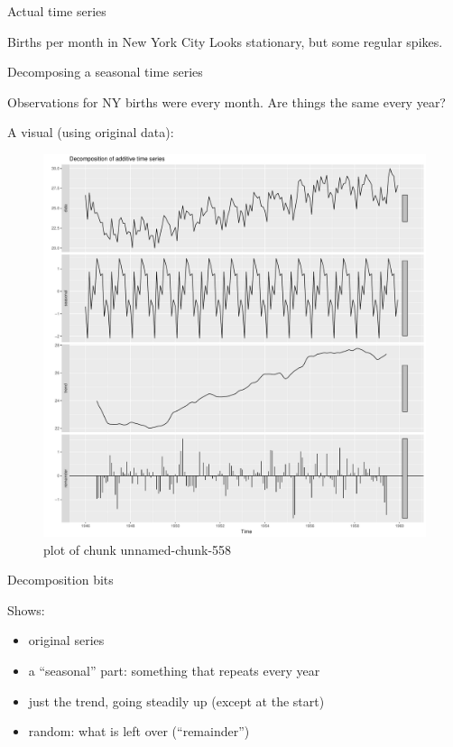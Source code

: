 \documentclass[ignorenonframetext,]{beamer}
\newenvironment{Shaded}{\begin{snugshade}}{\end{snugshade}}
\newcommand{\KeywordTok}[1]{\textcolor[rgb]{0.13,0.29,0.53}{\textbf{#1}}}
\newcommand{\NormalTok}[1]{#1}
\newcommand{\OperatorTok}[1]{\textcolor[rgb]{0.81,0.36,0.00}{\textbf{#1}}}
\newcommand{\StringTok}[1]{\textcolor[rgb]{0.31,0.60,0.02}{#1}}
\providecommand{\tightlist}{%
  \setlength{\itemsep}{0pt}\setlength{\parskip}{0pt}}
\begin{document}
\begin{frame}[fragile]{Actual time series}
\begin{block}{Births per month in New York City}
Looks stationary, but some regular spikes.

\end{block}

\begin{block}{Decomposing a seasonal time series}

Observations for NY births were every month. Are things the same every
year?

A visual (using original data):

\begin{Shaded}
\end{Shaded}

\begin{figure}
\centering
\includegraphics{figure/unnamed-chunk-558-1.pdf}
\caption{plot of chunk unnamed-chunk-558}
\end{figure}

Decomposition bits

Shows:

\begin{itemize}
\tightlist
\item
  original series
\item
  a ``seasonal'' part: something that repeats every year
\item
  just the trend, going steadily up (except at the start)
\item
  random: what is left over (``remainder'')
\end{itemize}


\end{block}
\end{frame}
\end{document}
